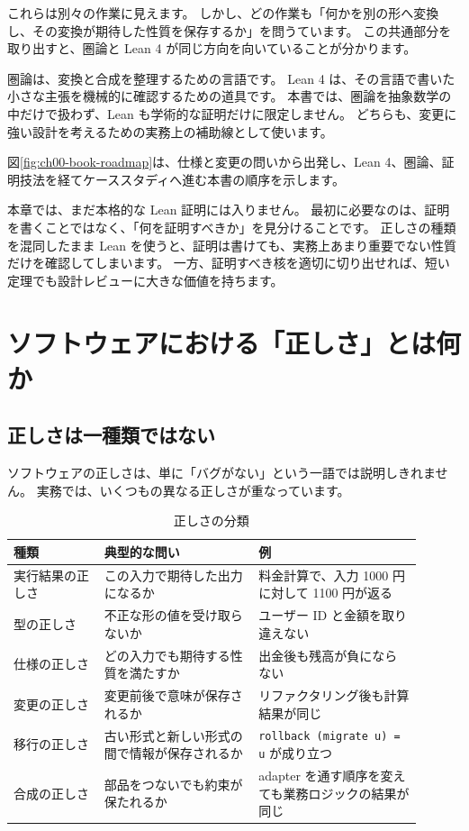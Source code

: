 これらは別々の作業に見えます。
しかし、どの作業も「何かを別の形へ変換し、その変換が期待した性質を保存するか」を問うています。
この共通部分を取り出すと、圏論と Lean 4 が同じ方向を向いていることが分かります。

圏論は、変換と合成を整理するための言語です。
Lean 4 は、その言語で書いた小さな主張を機械的に確認するための道具です。
本書では、圏論を抽象数学の中だけで扱わず、Lean も学術的な証明だけに限定しません。
どちらも、変更に強い設計を考えるための実務上の補助線として使います。

図\ref{fig:ch00-book-roadmap}は、仕様と変更の問いから出発し、Lean 4、圏論、証明技法を経てケーススタディへ進む本書の順序を示します。


本章では、まだ本格的な Lean 証明には入りません。
最初に必要なのは、証明を書くことではなく、「何を証明すべきか」を見分けることです。
正しさの種類を混同したまま Lean を使うと、証明は書けても、実務上あまり重要でない性質だけを確認してしまいます。
一方、証明すべき核を適切に切り出せれば、短い定理でも設計レビューに大きな価値を持ちます。

\section{ソフトウェアにおける「正しさ」とは何か}
\label{sec:ch00-correctness}

\subsection{正しさは一種類ではない}

ソフトウェアの正しさは、単に「バグがない」という一語では説明しきれません。
実務では、いくつもの異なる正しさが重なっています。

\begin{table}[htbp]
\centering
\caption{正しさの分類}
\label{tab:ch00-correctness-kinds}
\begin{tabular}{p{0.20\linewidth}p{0.34\linewidth}p{0.36\linewidth}}
\toprule
種類 & 典型的な問い & 例 \\
\midrule
実行結果の正しさ & この入力で期待した出力になるか & 料金計算で、入力 1000 円に対して 1100 円が返る \\
型の正しさ & 不正な形の値を受け取らないか & ユーザー ID と金額を取り違えない \\
仕様の正しさ & どの入力でも期待する性質を満たすか & 出金後も残高が負にならない \\
変更の正しさ & 変更前後で意味が保存されるか & リファクタリング後も計算結果が同じ \\
移行の正しさ & 古い形式と新しい形式の間で情報が保存されるか & \texttt{rollback (migrate u) = u} が成り立つ \\
合成の正しさ & 部品をつないでも約束が保たれるか & adapter を通す順序を変えても業務ロジックの結果が同じ \\
\bottomrule
\end{tabular}
\end{table}

